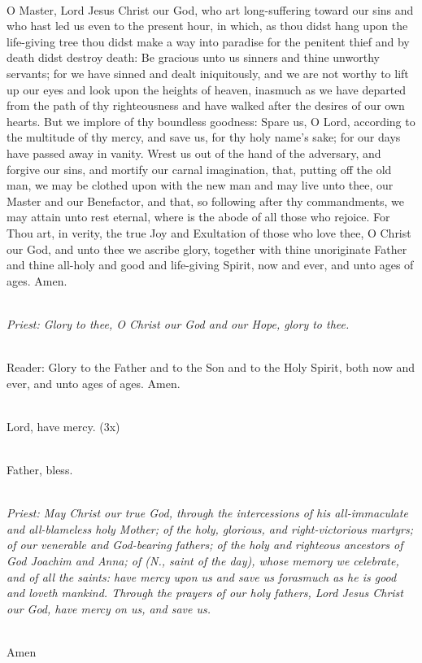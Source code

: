 {\mbox{}\\
O Master, Lord Jesus Christ our God, who art long-suffering toward our sins 
and who hast led us even to the present hour, in which, as thou didst hang 
upon the life-giving tree thou didst make a way into paradise for the penitent 
thief and by death didst destroy death: Be gracious unto us sinners and thine 
unworthy servants; for we have sinned and dealt iniquitously, and we are not 
worthy to lift up our eyes and look upon the heights of heaven, inasmuch as 
we have departed from the path of thy righteousness and have walked after the 
desires of our own hearts. But we implore of thy boundless goodness: Spare 
us, O Lord, according to the multitude of thy mercy, and save us, for thy holy 
name’s sake; for our days have passed away in vanity. Wrest us out of the 
hand of the adversary, and forgive our sins, and mortify our carnal 
imagination, that, putting off the old man, we may be clothed upon with the 
new man and may live unto thee, our Master and our Benefactor, and that, so 
following after thy commandments, we may attain unto rest eternal, where is 
the abode of all those who rejoice. For Thou art, in verity, the true Joy and 
Exultation of those who love thee, O Christ our God, and unto thee we ascribe 
glory, together with thine unoriginate Father and thine all-holy and good and 
life-giving Spirit, now and ever, and unto ages of ages. Amen. 

\mbox{}\\
\emph {Priest: Glory to thee, O Christ our God and our Hope, glory to thee.}

\mbox{}\\
Reader: Glory to the Father and to the Son and to the Holy Spirit, both now and ever, 
and unto ages of ages. Amen.

\mbox{}\\
Lord, have mercy. (3x) 

\mbox{}\\
Father, bless.

\mbox{}\\
\emph{Priest: May Christ our true God,
through the intercessions of his all-immaculate and all-blameless holy Mother;
of the holy, glorious, and right-victorious martyrs; 
of our venerable and God-bearing fathers; of the holy and righteous ancestors 
of God Joachim and Anna; of (N., saint of the day), whose memory we 
celebrate, and of all the saints: have mercy upon us and save us forasmuch as 
he is good and loveth mankind. 
Through the prayers of our holy fathers, Lord Jesus Christ our God, have 
mercy on us, and save us.}

\mbox{}\\
Amen
}
